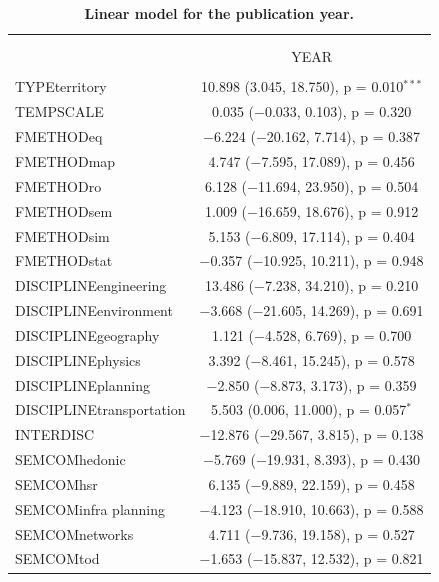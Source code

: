\documentclass[10pt]{article}
\begin{document}
\begin{table}%
\centering
  \caption{\textbf{Linear model for the publication year.}\label{tab:app:modelography:year}}
\begin{tabular}{@{\extracolsep{5pt}}lc} 
\footnotesize
\\[-1.8ex]\hline 
\hline \\[-1.8ex] 
\\[-1.8ex] & YEAR \\ 
\hline \\[-1.8ex] 
 TYPEterritory & 10.898 (3.045, 18.750), p = 0.010$^{***}$ \\ 
  TEMPSCALE & 0.035 ($-$0.033, 0.103), p = 0.320 \\ 
  FMETHODeq & $-$6.224 ($-$20.162, 7.714), p = 0.387 \\ 
  FMETHODmap & 4.747 ($-$7.595, 17.089), p = 0.456 \\ 
  FMETHODro & 6.128 ($-$11.694, 23.950), p = 0.504 \\ 
  FMETHODsem & 1.009 ($-$16.659, 18.676), p = 0.912 \\ 
  FMETHODsim & 5.153 ($-$6.809, 17.114), p = 0.404 \\ 
  FMETHODstat & $-$0.357 ($-$10.925, 10.211), p = 0.948 \\ 
  DISCIPLINEengineering & 13.486 ($-$7.238, 34.210), p = 0.210 \\ 
  DISCIPLINEenvironment & $-$3.668 ($-$21.605, 14.269), p = 0.691 \\ 
  DISCIPLINEgeography & 1.121 ($-$4.528, 6.769), p = 0.700 \\ 
  DISCIPLINEphysics & 3.392 ($-$8.461, 15.245), p = 0.578 \\ 
  DISCIPLINEplanning & $-$2.850 ($-$8.873, 3.173), p = 0.359 \\ 
  DISCIPLINEtransportation & 5.503 (0.006, 11.000), p = 0.057$^{*}$ \\ 
  INTERDISC & $-$12.876 ($-$29.567, 3.815), p = 0.138 \\ 
  SEMCOMhedonic & $-$5.769 ($-$19.931, 8.393), p = 0.430 \\ 
  SEMCOMhsr & 6.135 ($-$9.889, 22.159), p = 0.458 \\ 
  SEMCOMinfra planning & $-$4.123 ($-$18.910, 10.663), p = 0.588 \\ 
  SEMCOMnetworks & 4.711 ($-$9.736, 19.158), p = 0.527 \\ 
  SEMCOMtod & $-$1.653 ($-$15.837, 12.532), p = 0.821 \\ 

\end{tabular}
\end{table}
\end{document}
